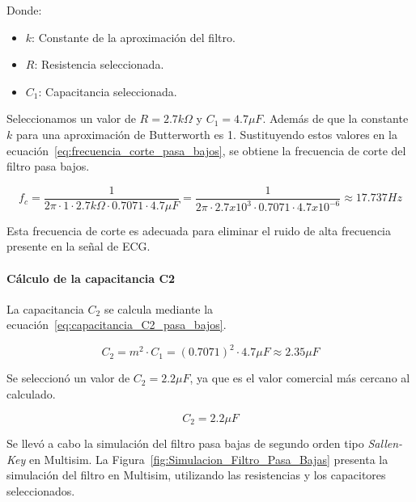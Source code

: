         Donde:
        \begin{itemize}
            \item $k$: Constante de la aproximación del filtro.
            \item $R$: Resistencia seleccionada.
            \item $C_1$: Capacitancia seleccionada.
        \end{itemize}

        Seleccionamos un valor de $R = 2.7 k\Omega$ y $C_1 = 4.7 \mu F$. Además de que la constante $k$ para una aproximación de Butterworth es 1. Sustituyendo estos valores en la ecuación~\ref{eq:frecuencia_corte_pasa_bajos}, se obtiene la frecuencia de corte del filtro pasa bajos.

        \begin{equation}
            \label{eq:frecuencia_corte_pasa_bajos_valor}
            f_c = \frac{1}{2\pi \cdot 1 \cdot 2.7 k\Omega \cdot 0.7071\cdot 4.7 \mu F} = \frac{1}{2\pi \cdot 2.7 x10^3 \cdot 0.7071\cdot 4.7 x10^{-6}} \approx 17.737 Hz
        \end{equation}

        Esta frecuencia de corte es adecuada para eliminar el ruido de alta frecuencia presente en la señal de ECG.

        \paragraph{Cálculo de la capacitancia C2}
        La capacitancia $C_2$ se calcula mediante la ecuación~\ref{eq:capacitancia_C2_pasa_bajos}.

        \begin{equation}
            \label{eq:capacitancia_C2_pasa_bajos}
            C_2 = m^2 \cdot C_1 = (0.7071)^2 \cdot 4.7 \mu F \approx 2.35 \mu F
        \end{equation}

        Se seleccionó un valor de $C_2 = 2.2 \mu F$, ya que es el valor comercial más cercano al calculado.

        \begin{equation}
            C_2 = 2.2 \mu F
        \end{equation}

        Se llevó a cabo la simulación del filtro pasa bajas de segundo orden tipo \textit{Sallen-Key} en Multisim. La Figura~\ref{fig:Simulacion_Filtro_Pasa_Bajas} presenta la simulación del filtro en Multisim, utilizando las resistencias y los capacitores seleccionados.

